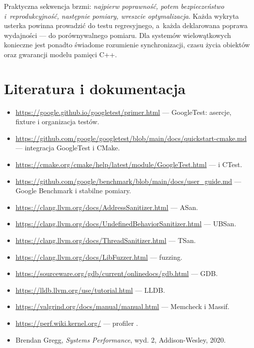 Praktyczna sekwencja brzmi: \emph{najpierw poprawność, potem
bezpieczeństwo i~reprodukcyjność, następnie pomiary, wreszcie
optymalizacja}. Każda wykryta usterka powinna prowadzić do testu
regresyjnego, a~każda deklarowana poprawa wydajności --- do
porównywalnego pomiaru. Dla systemów wielowątkowych konieczne jest
ponadto świadome rozumienie synchronizacji, czasu życia obiektów
oraz gwarancji modelu pamięci C++.

\section*{Literatura i dokumentacja}
\begingroup
\sloppy
\begin{itemize}
\item \url{https://google.github.io/googletest/primer.html} ---
      GoogleTest: asercje, fixture i organizacja testów.
\item \url{https://github.com/google/googletest/blob/main/docs/quickstart-cmake.md}
      --- integracja GoogleTest i CMake.
\item \url{https://cmake.org/cmake/help/latest/module/GoogleTest.html}
      ---  i CTest.
\item \url{https://github.com/google/benchmark/blob/main/docs/user_guide.md}
      --- Google Benchmark i stabilne pomiary.
\item \url{https://clang.llvm.org/docs/AddressSanitizer.html} --- ASan.
\item \url{https://clang.llvm.org/docs/UndefinedBehaviorSanitizer.html}
      --- UBSan.
\item \url{https://clang.llvm.org/docs/ThreadSanitizer.html} --- TSan.
\item \url{https://clang.llvm.org/docs/LibFuzzer.html} --- fuzzing.
\item \url{https://sourceware.org/gdb/current/onlinedocs/gdb.html} --- GDB.
\item \url{https://lldb.llvm.org/use/tutorial.html} --- LLDB.
\item \url{https://valgrind.org/docs/manual/manual.html} --- Memcheck i Massif.
\item \url{https://perf.wiki.kernel.org/} --- profiler .
\item Brendan Gregg, \emph{Systems Performance}, wyd. 2,
      Addison-Wesley, 2020.
\end{itemize}
\endgroup
